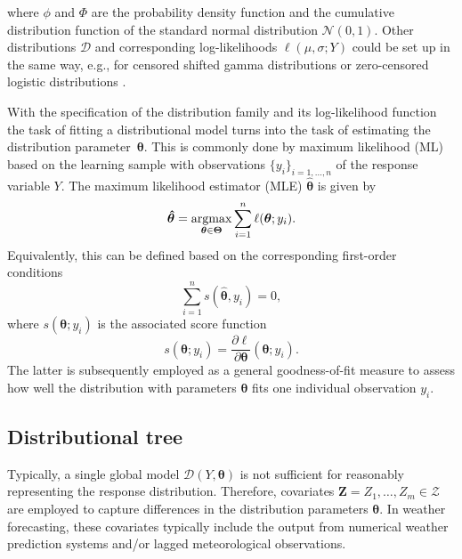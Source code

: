 \documentclass[aoas, preprint]{imsart}
\newcommand{\argmax}{\operatorname{argmax}\displaylimits}
\numberwithin{equation}{subsection}
\begin{document}
where $\phi$ and $\Phi$ are the probability density function and the cumulative
distribution function of the standard normal distribution $\mathcal{N}(0,1)$. 
Other distributions $\mathcal{D}$ and corresponding log-likelihoods
$\ell(\mu, \sigma; Y)$ could be set up in the same way, e.g., for
censored shifted gamma distributions \citep{Scheuerer+Hamill:2015} or
zero-censored logistic distributions \citep{Gebetsberger+Messner+Mayr:2017}.

With the specification of the distribution family and its log-likelihood 
function the task of fitting a distributional model turns into the task 
of estimating the distribution parameter~$\bm{\theta}$. This is commonly done by
maximum likelihood (ML) based on the learning sample with observations
$\{y_i\}_{i = 1, \dots, n}$ of the response variable $Y$. The maximum
likelihood estimator (MLE) $\bm{\hat \theta}$ is given by
\begin{equation}
\label{eq:mle}
\bm{\hat \theta} = \argmax_{\bm{\theta} \in \bm{\Theta}} \sum_{i=1}^n \ell(\bm{\theta}; y_i).
\end{equation}
Equivalently, this can be defined based on the corresponding first-order
conditions
\begin{equation}
\label{eq:foc}
\sum_{i = 1}^n s(\bm{\hat{\theta}}, y_i) = 0,
\end{equation}
where $s(\bm{\theta}; y_i)$ is the associated score function
\begin{equation}
\label{eq:score}
s(\bm{\theta}; y_i) = \frac{\partial \ell}{\partial \bm{\theta}}(\bm{\theta}; y_i).
\end{equation}
The latter is subsequently employed as a general goodness-of-fit measure
to assess how well the distribution with parameters $\bm{\theta}$ fits
one individual observation $y_i$.


\subsection{Distributional tree}
\label{sec:disttree}

Typically, a single global model $\mathcal{D}(Y, \bm{\theta})$ is not sufficient
for reasonably representing the response distribution. Therefore, covariates
$\bm{Z} = Z_1, \dots, Z_m \in \mathcal{Z}$ are
employed to capture differences in the distribution parameters $\bm{\theta}$.
In weather forecasting, these covariates typically include the output
from numerical weather prediction systems and/or lagged meteorological observations.
\end{document}
